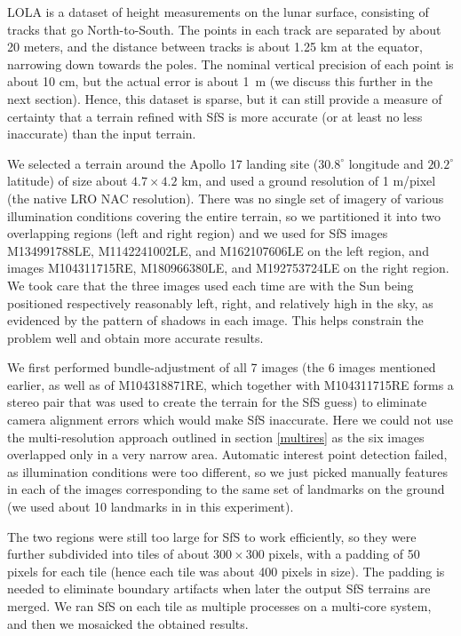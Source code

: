 \documentclass[12pt,oneside]{article}
\begin{document}
LOLA is a dataset of height measurements on the lunar surface, consisting
of tracks that go North-to-South. The points in each track are separated by about 20 meters,
and the distance between tracks is about 1.25 km at the equator, narrowing down 
towards the poles. The nominal vertical precision of each point is about 10 cm, but the actual error
is about 1~m (we discuss this further in the next section). Hence, this dataset is sparse, but it can still provide a measure of certainty that 
a terrain refined with SfS is more accurate (or at least no less inaccurate) than
the input terrain.

We selected a terrain around the Apollo 17 landing site ($30.8^\circ$
longitude and $20.2^\circ$ latitude) of size about $4.7 \times 4.2$ km,
and used a ground resolution of 1 m/pixel (the native LRO NAC
resolution). There was no single set of imagery of various illumination
conditions covering the entire terrain, so we partitioned it into two
overlapping regions (left and right region) and we used for SfS images
M134991788LE, M1142241002LE, and M162107606LE on the left region, and images
M104311715RE, M180966380LE, and M192753724LE on the right region. We
took care that the three images used each time are with the Sun being
positioned respectively reasonably left, right, and relatively high in
the sky, as evidenced by the pattern of shadows in each image. This
helps constrain the problem well and obtain more accurate results.

We first performed bundle-adjustment of all 7 images (the 6 images
mentioned earlier, as well as of M104318871RE, which together with
M104311715RE forms a stereo pair that was used to create the terrain for the
SfS guess) to eliminate camera alignment errors which would make SfS
inaccurate. Here we could not use the multi-resolution approach outlined
in section \ref{multires} as the six images overlapped only in a very
narrow area. Automatic interest point detection failed, as illumination
conditions were too different, so we just picked manually features in
each of the images corresponding to the same set of landmarks on the
ground (we used about 10 landmarks in in this experiment).

The two regions were still too large for SfS to work efficiently,
so they were further subdivided into tiles of about $300 \times 300$ pixels,
with a padding of 50 pixels for each tile (hence each tile was about 400 pixels in size).
The padding is needed to eliminate boundary artifacts when later the output SfS terrains are merged. We ran SfS on each tile
as multiple processes on a multi-core system, and then we mosaicked the obtained results.
\end{document}
